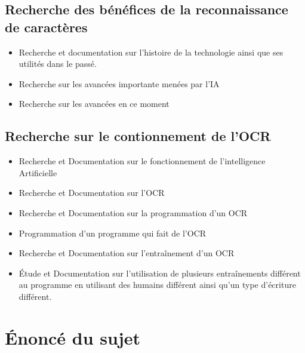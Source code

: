 \documentclass[letterpaper,10pt,french]{sphinxmanual}
\begin{document}
\subsection{Recherche des bénéfices de la reconnaissance de caractères}
\label{\detokenize{plan:recherche-des-benefices-de-la-reconnaissance-de-caracteres}}\begin{itemize}
\item {} 
Recherche et documentation sur l’histoire de la technologie ainsi que ses
utilités dans le passé.

\item {} 
Recherche sur les avancées importante menées par l’IA

\item {} 
Recherche sur les avancées en ce moment

\end{itemize}


\subsection{Recherche sur le contionnement de l’OCR}
\label{\detokenize{plan:recherche-sur-le-contionnement-de-l-ocr}}\begin{itemize}
\item {} 
Recherche et Documentation sur le fonctionnement de l’intelligence Artificielle

\item {} 
Recherche et Documentation sur l’OCR

\item {} 
Recherche et Documentation sur la programmation d’un OCR

\item {} 
Programmation d’un programme qui fait de l’OCR

\item {} 
Recherche et Documentation sur l’entraînement d’un OCR

\item {} 
Étude et Documentation sur l’utilisation de plusieurs entraînements différent
au programme en utilisant des humains différent ainsi qu’un type d’écriture
différent.

\end{itemize}


\section{Énoncé du sujet}
\label{\detokenize{biblio_commented:enonce-du-sujet}}\label{\detokenize{biblio_commented::doc}}






\renewcommand{\indexname}{Index}
\printindex
\end{document}
